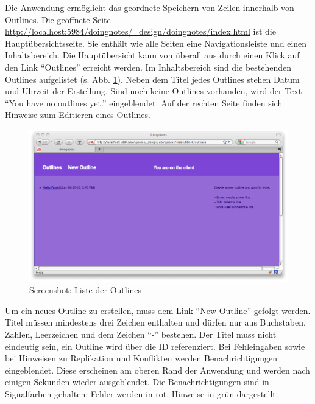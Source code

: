 Die Anwendung ermöglicht das geordnete Speichern von Zeilen innerhalb von Outlines. Die geöffnete Seite {\url{http://localhost:5984/doingnotes/\_design/doingnotes/index.html}} ist die Hauptübersichtsseite. Sie enthält wie alle Seiten eine Navigationsleiste und einen Inhaltsbereich. Die Hauptübersicht kann von überall aus durch einen Klick auf den Link \enquote{Outlines} erreicht werden. Im Inhaltsbereich sind die bestehenden Outlines aufgelistet (s. Abb. \ref{fig:outline-list}). Neben dem Titel jedes Outlines stehen Datum und Uhrzeit der Erstellung. Sind noch keine Outlines vorhanden, wird der Text \enquote{You have no outlines yet.} eingeblendet. Auf der rechten Seite finden sich Hinweise zum Editieren eines Outlines. 

\medskip
\begin{figure}[ht] 
  \begin{center}
    \includegraphics[width=\textwidth]{grafik/screenshot-outline-list} 
  \end{center}
  \caption{Screenshot: Liste der Outlines}
  \label{fig:outline-list} 
\end{figure}

Um ein neues Outline zu erstellen, muss dem Link \enquote{New Outline} gefolgt werden. Titel müssen mindestens drei Zeichen enthalten und dürfen nur aus Buchstaben, Zahlen, Leerzeichen und dem Zeichen \enquote{-} bestehen. Der Titel muss nicht eindeutig sein, ein Outline wird über die ID referenziert. Bei Fehleingaben sowie bei Hinweisen zu Replikation und Konflikten werden Benachrichtigungen eingeblendet. Diese erscheinen am oberen Rand der Anwendung und werden nach einigen Sekunden wieder ausgeblendet. Die Benachrichtigungen sind in Signalfarben gehalten: Fehler werden in rot, Hinweise in grün dargestellt. 

